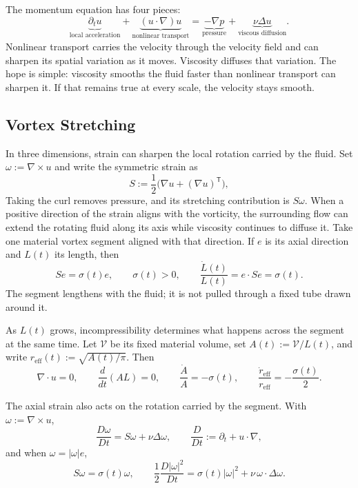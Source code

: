 
The momentum equation has four pieces:
\[
  \underbrace{\partial_t u}_{\text{local acceleration}}
  +
  \underbrace{(u\cdot\nabla)u}_{\text{nonlinear transport}}
  =
  \underbrace{-\nabla p}_{\text{pressure}}
  +
  \underbrace{\nu\Delta u}_{\text{viscous diffusion}}.
\]
Nonlinear transport carries the velocity through the velocity field and can sharpen its spatial variation as it moves.
Viscosity diffuses that variation.
The hope is simple: viscosity smooths the fluid faster than nonlinear transport can sharpen it.
If that remains true at every scale, the velocity stays smooth.

\subsection{Vortex Stretching}\label{sub:ThePerfectlyStretchingVortex}

In three dimensions, strain can sharpen the local rotation carried by the fluid.
Set \(\omega:=\nabla\times u\) and write the symmetric strain as
\[
  S:=\frac12\bigl(\nabla u+(\nabla u)^{\mathsf T}\bigr),
\]
Taking the curl removes pressure, and its stretching contribution is \(S\omega\).
When a positive direction of the strain aligns with the vorticity, the surrounding flow can extend the rotating fluid along its axis while viscosity continues to diffuse it.
Take one material vortex segment aligned with that direction.
If \(e\) is its axial direction and \(L(t)\) its length, then
\[
  Se=\sigma(t)e,
  \qquad
  \sigma(t)>0,
  \qquad
  \frac{\dot L(t)}{L(t)}
  =
  e\cdot Se
  =
  \sigma(t).
\]
The segment lengthens with the fluid; it is not pulled through a fixed tube drawn around it.

As \(L(t)\) grows, incompressibility determines what happens across the segment at the same time.
Let \(\mathcal V\) be its fixed material volume, set \(A(t):=\mathcal V/L(t)\), and write \(r_{\mathrm{eff}}(t):=\sqrt{A(t)/\pi}\).
Then
\[
  \nabla\cdot u=0,
  \qquad
  \frac{d}{dt}(A L)=0,
  \qquad
  \frac{\dot A}{A}=-\sigma(t),
  \qquad
  \frac{\dot r_{\mathrm{eff}}}{r_{\mathrm{eff}}}
  =
  -\frac{\sigma(t)}{2}.
\]

The axial strain also acts on the rotation carried by the segment.
With \(\omega:=\nabla\times u\),
\[
  \frac{D\omega}{Dt}
  =
  S\omega+\nu\Delta\omega,
  \qquad
  \frac{D}{Dt}
  :=
  \partial_t+u\cdot\nabla,
\]
and when \(\omega=|\omega|e\),
\[
  S\omega
  =
  \sigma(t)\omega,
  \qquad
  \frac12\frac{D|\omega|^2}{Dt}
  =
  \sigma(t)|\omega|^2
  +
  \nu\,\omega\cdot\Delta\omega.
\]

